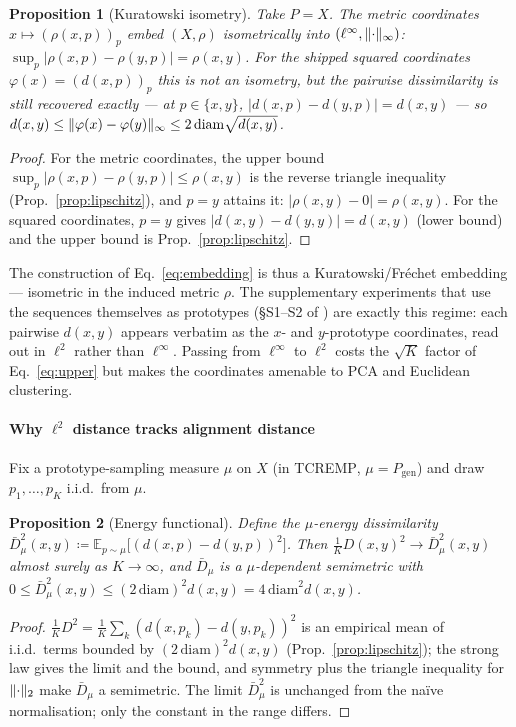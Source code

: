 \documentclass[11pt]{article}
\theoremstyle{oldplain}
\newtheorem{proposition}{Proposition}
\theoremstyle{oldrem}
\newcommand{\Pgen}{P_{\mathrm{gen}}}
\newcommand{\E}{\mathds{E}}
\DeclarePairedDelimiter{\norm}{\lVert}{\rVert}
\begin{document}
\begin{proposition}[Kuratowski isometry]\label{prop:kuratowski}
Take $P=X$. The \emph{metric} coordinates $x\mapsto(\rho(x,p))_{p}$ embed $(X,\rho)$ isometrically into
$(\ell^\infty,\norm{\cdot}_\infty)$: $\sup_p\lvert\rho(x,p)-\rho(y,p)\rvert=\rho(x,y)$. For the shipped
\emph{squared} coordinates $\varphi(x)=(d(x,p))_p$ this is not an isometry, but the pairwise dissimilarity
is still recovered exactly --- at $p\in\{x,y\}$, $\lvert d(x,p)-d(y,p)\rvert=d(x,y)$ --- so
$d(x,y)\le\norm{\varphi(x)-\varphi(y)}_\infty\le 2\,\mathrm{diam}\sqrt{d(x,y)}$.
\end{proposition}
\begin{proof}
For the metric coordinates, the upper bound $\sup_p\lvert\rho(x,p)-\rho(y,p)\rvert\le\rho(x,y)$ is the
reverse triangle inequality (Prop.~\ref{prop:lipschitz}), and $p=y$ attains it: $\lvert\rho(x,y)-0\rvert
=\rho(x,y)$. For the squared coordinates, $p=y$ gives $\lvert d(x,y)-d(y,y)\rvert=d(x,y)$ (lower bound) and
the upper bound is Prop.~\ref{prop:lipschitz}.
\end{proof}

The construction of Eq.~\eqref{eq:embedding} is thus a Kuratowski/Fr\'echet embedding --- isometric in the
induced metric $\rho$. The supplementary experiments that use the sequences themselves as prototypes
(\S S1--S2 of \cite{Kremlyakova2025}) are exactly this regime: each pairwise $d(x,y)$ appears verbatim as
the $x$- and $y$-prototype coordinates, read out in $\ell^2$ rather than $\ell^\infty$. Passing from
$\ell^\infty$ to $\ell^2$ costs the $\sqrt K$ factor of Eq.~\eqref{eq:upper} but makes the coordinates
amenable to {\scshape PCA} and Euclidean clustering.

\paragraph{Why $\ell^2$ distance tracks alignment distance} Fix a prototype-sampling measure $\mu$ on
$X$ (in {\scshape TCREMP}, $\mu=\Pgen$) and draw $p_1,\dots,p_K$ i.i.d.\ from $\mu$.

\begin{proposition}[Energy functional]\label{prop:energy}
Define the $\mu$-energy dissimilarity
$\bar D_\mu^2(x,y) \coloneqq \E_{p\sim\mu}\!\bigl[(d(x,p)-d(y,p))^2\bigr]$. Then
$\tfrac1K D(x,y)^2 \to \bar D_\mu^2(x,y)$ almost surely as $K\to\infty$, and $\bar D_\mu$ is a
$\mu$-dependent semimetric with $0\le\bar D_\mu^2(x,y)\le (2\,\mathrm{diam})^2 d(x,y)=4\,\mathrm{diam}^2 d(x,y)$.
\end{proposition}
\begin{proof}
$\tfrac1K D^2 = \tfrac1K\sum_k (d(x,p_k)-d(y,p_k))^2$ is an empirical mean of i.i.d.\ terms bounded by
$(2\,\mathrm{diam})^2 d(x,y)$ (Prop.~\ref{prop:lipschitz}); the strong law gives the limit and the bound,
and symmetry plus the triangle inequality for $\norm{\cdot}_2$ make $\bar D_\mu$ a semimetric. The limit
$\bar D_\mu^2$ is unchanged from the na\"ive normalisation; only the constant in the range differs.
\end{proof}
\end{document}

